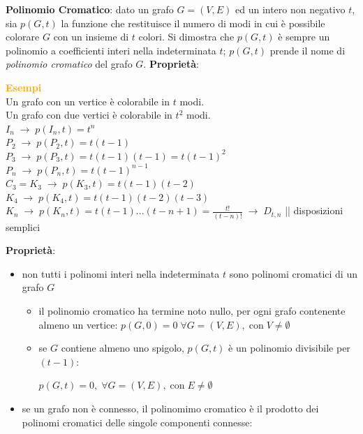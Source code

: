 \begin{flushleft}
    \textbf{Polinomio Cromatico}: dato un grafo $G = (V, E)$ ed un intero non negativo $t$, sia $p(G, t)$ la funzione che restituisce il numero di modi in cui è possibile colorare $G$ con un insieme di $t$ colori. Si dimostra che $p(G, t)$ è sempre un polinomio a coefficienti interi nella indeterminata $t$; $p(G, t)$ prende il nome di \textit{polinomio cromatico} del grafo $G$. \textbf{Proprietà}:
    \begin{boxA}
        \textcolor{orange}{\textbf{Esempi}} \\
        Un grafo con un vertice è colorabile in $t$ modi. \\
        Un grafo con due vertici è colorabile in $t^2$ modi. \\
        $I_n \; \rightarrow \; p(I_n, t) = t^n$ \\
        $P_2 \; \rightarrow \; p(P_2, t) = t(t-1)$ \\
        $P_3 \; \rightarrow \; p(P_3, t) = t(t-1)(t-1) = t(t-1)^2$ \\
        $P_n \; \rightarrow \; p(P_n, t) = t(t-1)^{n-1}$ \\
        $C_3 = K_3 \; \rightarrow \; p(K_3, t) = t(t-1)(t-2)$ \\
        $K_4 \; \rightarrow \; p(K_4, t) = t(t-1)(t-2)(t-3)$ \\
        $K_n \; \rightarrow \; p(K_n, t) = t(t-1) ... (t-n+1) = \frac{t!}{(t-n)!} \; \rightarrow \; D_{t, n}$ || disposizioni semplici
    \end{boxA}
    \textbf{Proprietà}:
    \begin{itemize}[nosep]
        \item non tutti i polinomi interi nella indeterminata $t$ sono polinomi cromatici di un grafo $G$
        \begin{itemize}[nosep]
            \item il polinomio cromatico ha termine noto nullo, per ogni grafo contenente almeno un vertice: $p(G, 0) = 0 \; \forall G = (V, E), \; \text{con} \; V \neq \emptyset$
            \item se $G$ contiene almeno uno spigolo, $p(G, t)$ è un polinomio divisibile per $(t-1)$: 
            
            {\centering
                $p(G, t) = 0, \; \forall G = (V, E), \; \text{con} \; E \neq \emptyset$
            \par}
        \end{itemize}
        \item se un grafo non è connesso, il polinomimo cromatico è il prodotto dei polinomi cromatici delle singole componenti connesse:


\end{itemize}
\end{flushleft}

